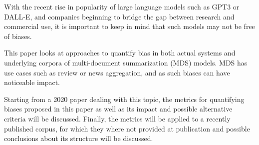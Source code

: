 \documentclass[../main.tex]{subfiles}
\begin{document}
With the recent rise in popularity of large language models such as GPT3\cite{openai_2021} or DALL-E\cite{dalle-https://doi.org/10.48550/arxiv.2204.06125},
and companies beginning to bridge the gap between research and commercial use,
it is important to keep in mind that such models may not be free of biases.\cite{gpt3-https://doi.org/10.48550/arxiv.2102.02503}

This paper looks at approaches to quantify bias in both actual systems and underlying corpora of multi-document summarization (MDS) models.
MDS has use cases such as review or news aggregation, and as such biases can have noticeable impact.\cite{dey-etal-2020-corpora}

Starting from a 2020 paper\cite{dey-etal-2020-corpora} dealing with this topic,
the metrics for quantifying biases proposed in this paper as well as its impact and possible alternative criteria will be discussed.
Finally, the metrics will be applied to a recently published corpus, for which they where not provided at publication and possible conclusions about its structure will be discussed.
\end{document}
